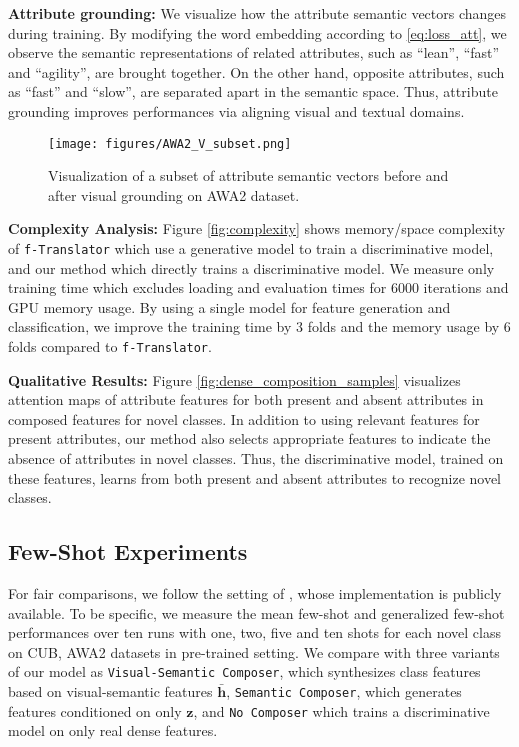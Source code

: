 \documentclass[10pt,journal,compsoc]{IEEEtran}
\newcommand{\z}{\boldsymbol{z}}
\newcommand{\h}{\boldsymbol{h}}
\newcommand{\1}{\boldsymbol{1}}
\newcommand{\0}{\boldsymbol{0}}
\newcommand{\<}{\langle}
\renewcommand{\>}{\rangle}
\newcommand{\myparagraph}[1]{\vspace{-2pt}\medskip\noindent\textbf{#1}}
\begin{document}
\myparagraph{Attribute grounding:}
We visualize how the attribute semantic vectors changes during training.
By modifying the word embedding according to \eqref{eq:loss_att}, we observe the semantic representations of related attributes, such as ``lean'', ``fast'' and ``agility'', are brought together. On the other hand, opposite attributes, such as ``fast'' and ``slow'', are separated apart in the semantic space.
Thus, attribute grounding improves performances via aligning visual and textual domains.

\begin{figure}[h]
\centering
\texttt{[image: figures/AWA2\_V\_subset.png]}
\vspace{-0mm}
\caption{
\small{
Visualization of a subset of attribute semantic vectors before and after visual grounding on AWA2 dataset.
}
}
\label{fig:visual_grounding}
\end{figure}
\myparagraph{Complexity Analysis:}
Figure \ref{fig:complexity} shows memory/space complexity of \texttt{f-Translator} which use a generative model to train a discriminative model, and our method which directly trains a discriminative model. We measure only training time which excludes loading and evaluation times for 6000 iterations and GPU memory usage. By using a single model for feature generation and classification, we improve the training time by 3 folds and the memory usage by 6 folds compared to \texttt{f-Translator}.


\myparagraph{Qualitative Results:}
Figure \ref{fig:dense_composition_samples} visualizes attention maps of attribute features for both present and absent attributes in composed features for novel classes.
In addition to using relevant features for present attributes, our method also selects appropriate features to indicate the absence of attributes in novel classes.
Thus, the discriminative model, trained on these features, learns from both present and absent attributes to recognize novel classes.




\subsection{Few-Shot Experiments}
For fair comparisons, we follow the setting of \cite{Schonfeld:CVPR19}, whose implementation is publicly available.
To be specific, we measure the mean few-shot and generalized few-shot performances over ten runs with one, two, five and ten shots for each novel class on CUB, AWA2 datasets in pre-trained setting.
We compare with three variants of our model as \texttt{Visual-Semantic Composer}, which synthesizes class features based on visual-semantic features $\bar{\h}$, \texttt{Semantic Composer}, which generates features conditioned on only $\z$, and \texttt{No Composer} which trains a discriminative model on only real dense features.
\end{document}
